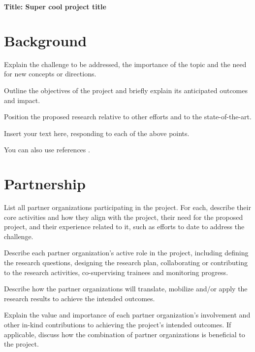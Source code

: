 \documentclass[english,
]{nserc-alliance}
\newcommand{\proposaltitle}{Super cool project title}
\begin{document}
\thispagestyle{firstpage}
\maketitle

\noindent \textbf{Title: \proposaltitle}

\section*{Background}
\ifinst\begin{instructions}
  \item Explain the challenge to be addressed, the importance of the topic and the need for new concepts or directions. 
  \item Outline the objectives of the project and briefly explain its anticipated outcomes and impact. 
  \item Position the proposed research relative to other efforts and to the state-of-the-art.
\end{instructions}\fi
  
\noindent Insert your text here, responding to each of the above points. 

You can also use references \cite{DBLPjournals/jsyml/Turing48,DBLPconf/afips/SolomonP76}.

\section*{Partnership}
\ifinst\begin{instructions}
  \item List all partner organizations participating in the project. For each, describe their core activities and how they align with the project, their need for the proposed project, and their experience related to it, such as efforts to date to address the challenge.
  \item	Describe each partner organization's active role in the project, including defining the research questions, designing the research plan, collaborating or contributing to the research activities, co-supervising trainees and monitoring progress.
  \item Describe how the partner organizations will translate, mobilize and/or apply the research results to achieve the intended outcomes. 
  \item Explain the value and importance of each partner organization's involvement and other in-kind contributions to achieving the project's intended outcomes. If applicable, discuss how the combination of partner organizations is beneficial to the project. 
\end{instructions}\fi
  
\end{document}
